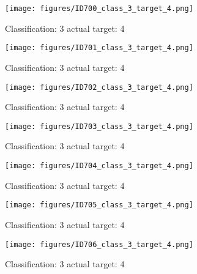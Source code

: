 \begin{figure}[h!]
\begin{center}
\texttt{[image: figures/ID700\_class\_3\_target\_4.png]}
\end{center}
\caption{ Classification: 3 actual target: 4}
\label{fig:ID700_class_3_target_4}
\end{figure}
\begin{figure}[h!]
\begin{center}
\texttt{[image: figures/ID701\_class\_3\_target\_4.png]}
\end{center}
\caption{ Classification: 3 actual target: 4}
\label{fig:ID701_class_3_target_4}
\end{figure}
\begin{figure}[h!]
\begin{center}
\texttt{[image: figures/ID702\_class\_3\_target\_4.png]}
\end{center}
\caption{ Classification: 3 actual target: 4}
\label{fig:ID702_class_3_target_4}
\end{figure}
\begin{figure}[h!]
\begin{center}
\texttt{[image: figures/ID703\_class\_3\_target\_4.png]}
\end{center}
\caption{ Classification: 3 actual target: 4}
\label{fig:ID703_class_3_target_4}
\end{figure}
\begin{figure}[h!]
\begin{center}
\texttt{[image: figures/ID704\_class\_3\_target\_4.png]}
\end{center}
\caption{ Classification: 3 actual target: 4}
\label{fig:ID704_class_3_target_4}
\end{figure}
\begin{figure}[h!]
\begin{center}
\texttt{[image: figures/ID705\_class\_3\_target\_4.png]}
\end{center}
\caption{ Classification: 3 actual target: 4}
\label{fig:ID705_class_3_target_4}
\end{figure}
\begin{figure}[h!]
\begin{center}
\texttt{[image: figures/ID706\_class\_3\_target\_4.png]}
\end{center}
\caption{ Classification: 3 actual target: 4}
\label{fig:ID706_class_3_target_4}
\end{figure}
